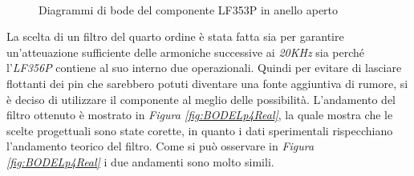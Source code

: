 \documentclass[titlepage]{report}
\begin{document}
	\begin{figure}[h]
		\centering
		 \qquad
		 \\
		\caption{Diagrammi di bode del componente LF353P in anello aperto}
		\label{fig:bode_LF353P}
	\end{figure}

	La scelta di un filtro del quarto ordine è stata fatta sia per garantire un'atteuazione sufficiente delle armoniche successive ai \textit{20KHz} sia perché l'\textit{LF356P} contiene al suo interno due operazionali. Quindi per evitare di lasciare flottanti dei pin che sarebbero potuti diventare una fonte aggiuntiva di rumore, si è deciso di utilizzare il componente al meglio delle possibilità.
	L'andamento del filtro ottenuto è mostrato in \textit{Figura \ref{fig:BODELp4Real}}, la quale mostra che le scelte progettuali sono state corette, in quanto i dati sperimentali rispecchiano l'andamento teorico del filtro.
	Come si può osservare in \textit{Figura \ref{fig:BODELp4Real}} i due andamenti sono molto simili.
	
\end{document}

